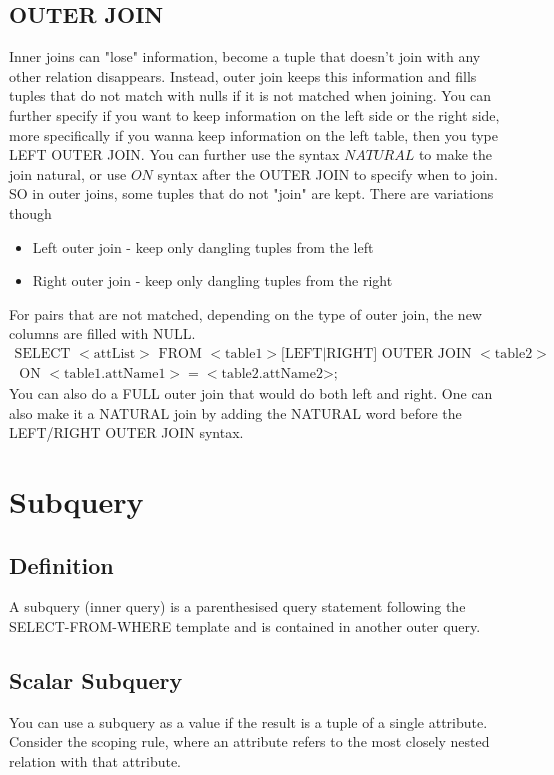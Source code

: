 \documentclass[a4paper]{article}
\theoremstyle{plain}
\theoremstyle{definition}
\theoremstyle{remark}
\begin{document}
\subsection{OUTER JOIN}
Inner joins can "lose" information, become a tuple that doesn't join with any other relation disappears. Instead, outer join keeps this information and fills tuples that do not match with nulls if it is not matched when joining. You can further specify if you want to keep information on the left side or the right side, more specifically if you wanna keep information on the left table, then you type LEFT OUTER JOIN. You can further use the syntax $NATURAL$ to make the join natural, or use $ON$ syntax after the OUTER JOIN to specify when to join. \\
SO in outer joins, some tuples that do not "join" are kept. There are variations though
\begin{itemize}
	\item Left outer join - keep only dangling tuples from the left
	\item Right outer join - keep only dangling tuples from the right
\end{itemize}
For pairs that are not matched, depending on the type of outer join, the new columns are filled with NULL. 
\begin{align*}
	\text{SELECT }<\text{attList}>\text{ FROM }<\text{table1}> \text{[LEFT|RIGHT] OUTER JOIN }<\text{table2}> \\ \text{ ON }<\text{table1.attName1}>=<\text{table2.attName2>;}
\end{align*}
You can also do a FULL outer join that would do both left and right. One can also make it a NATURAL join by adding the NATURAL word before the LEFT/RIGHT OUTER JOIN syntax. 
\section{Subquery}
\subsection{Definition}
A subquery (inner query) is a parenthesised query statement following the SELECT-FROM-WHERE template and is contained in another outer query. 
\subsection{Scalar Subquery}
You can use a subquery as a value if the result is a tuple of a single attribute. Consider the scoping rule, where an attribute refers to the most closely nested relation with that attribute.
\end{document}

